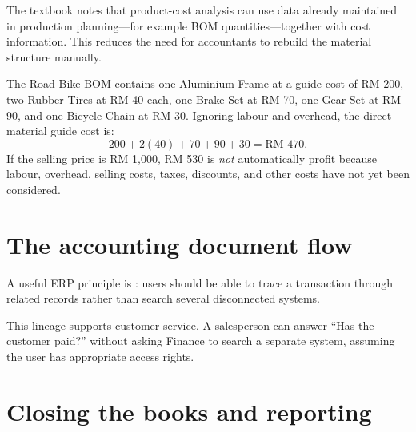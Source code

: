 The textbook notes that product-cost analysis can use data already maintained in production planning---for example BOM quantities---together with cost information. This reduces the need for accountants to rebuild the material structure manually.

\begin{workedexample}
The Road Bike BOM contains one Aluminium Frame at a guide cost of RM 200, two Rubber Tires at RM 40 each, one Brake Set at RM 70, one Gear Set at RM 90, and one Bicycle Chain at RM 30. Ignoring labour and overhead, the direct material guide cost is:
\[
200 + 2(40)+70+90+30=\text{RM }470.
\]
If the selling price is RM 1,000, RM 530 is \emph{not} automatically profit because labour, overhead, selling costs, taxes, discounts, and other costs have not yet been considered.
\end{workedexample}

\section{The accounting document flow}

A useful ERP principle is : users should be able to trace a transaction through related records rather than search several disconnected systems.

\begin{erpfigure}
\end{erpfigure}

This lineage supports customer service. A salesperson can answer ``Has the customer paid?'' without asking Finance to search a separate system, assuming the user has appropriate access rights.

\section{Closing the books and reporting}

